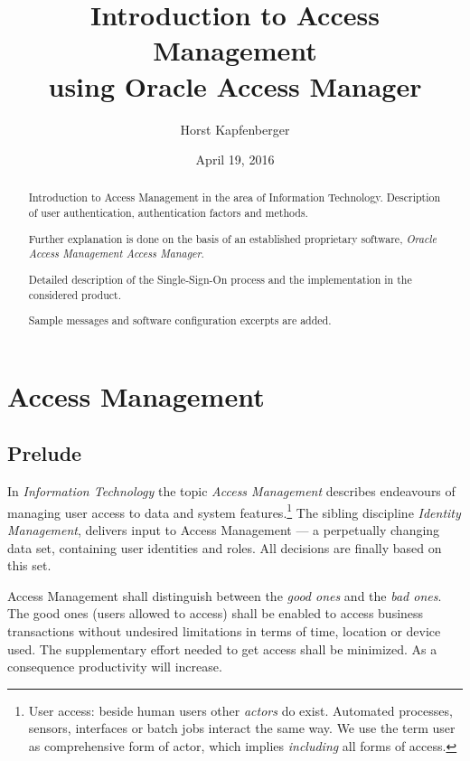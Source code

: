 \documentclass[11pt]{report}
\title{Introduction to Access Management \\
using Oracle Access Manager}
\author{Horst Kapfenberger}
\date{April 19, 2016}
\begin{document}
\maketitle

\begin{abstract}
    Introduction to Access Management in the area of Information
    Technology.  Description of user authentication, authentication
    factors and methods.
   
    Further explanation is done on the basis of an established
    proprietary software, \emph{Oracle Access Management Access
    Manager}.
    
    Detailed description of the Single-Sign-On process and the
    implementation in the considered product.

    Sample messages and software configuration excerpts are added.
\end{abstract}



\tableofcontents


\chapter{Access Management}

\section{Prelude}

In \emph{Information Technology} the topic \emph{Access Management}
describes endeavours of managing user access to data and system
features.\footnote{User access:  beside human users other \emph{actors}
do exist.  Automated processes, sensors, interfaces or batch jobs
interact the same way.  We use the term user as comprehensive form of
actor, which implies \emph{including} all forms of access.} The sibling
discipline \emph{Identity Management}, delivers input to Access
Management --- a perpetually changing data set, containing user
identities and roles. All decisions are finally based on this set.

Access Management shall distinguish between the \emph{good ones} and the
\emph{bad ones}.  The good ones (users allowed to access) shall be
enabled to access business transactions without undesired limitations in
terms of time, location or device used. The supplementary effort needed
to get access shall be minimized.  As a consequence productivity will
increase.
\end{document}
